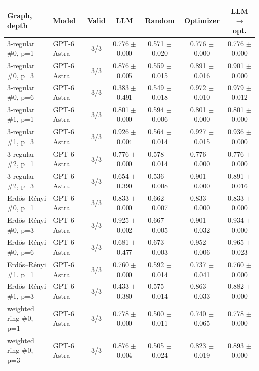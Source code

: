 \begin{tabular}{llccccc}
\toprule
Graph, depth & Model & Valid & LLM & Random & Optimizer & LLM$\to$opt. \\
\midrule
3-regular \#0, p=1 & GPT-6 Astra & 3/3 & 0.776 $\pm$ 0.000 & 0.571 $\pm$ 0.020 & 0.776 $\pm$ 0.000 & 0.776 $\pm$ 0.000 \\
3-regular \#0, p=3 & GPT-6 Astra & 3/3 & 0.876 $\pm$ 0.005 & 0.559 $\pm$ 0.015 & 0.891 $\pm$ 0.016 & 0.901 $\pm$ 0.000 \\
3-regular \#0, p=6 & GPT-6 Astra & 3/3 & 0.383 $\pm$ 0.491 & 0.549 $\pm$ 0.018 & 0.972 $\pm$ 0.010 & 0.979 $\pm$ 0.012 \\
3-regular \#1, p=1 & GPT-6 Astra & 3/3 & 0.801 $\pm$ 0.000 & 0.594 $\pm$ 0.006 & 0.801 $\pm$ 0.000 & 0.801 $\pm$ 0.000 \\
3-regular \#1, p=3 & GPT-6 Astra & 3/3 & 0.926 $\pm$ 0.004 & 0.564 $\pm$ 0.014 & 0.927 $\pm$ 0.015 & 0.936 $\pm$ 0.000 \\
3-regular \#2, p=1 & GPT-6 Astra & 3/3 & 0.776 $\pm$ 0.000 & 0.578 $\pm$ 0.014 & 0.776 $\pm$ 0.000 & 0.776 $\pm$ 0.000 \\
3-regular \#2, p=3 & GPT-6 Astra & 3/3 & 0.654 $\pm$ 0.390 & 0.536 $\pm$ 0.008 & 0.901 $\pm$ 0.000 & 0.891 $\pm$ 0.016 \\
Erd\H{o}s--R\'enyi \#0, p=1 & GPT-6 Astra & 3/3 & 0.833 $\pm$ 0.000 & 0.662 $\pm$ 0.007 & 0.833 $\pm$ 0.000 & 0.833 $\pm$ 0.000 \\
Erd\H{o}s--R\'enyi \#0, p=3 & GPT-6 Astra & 3/3 & 0.925 $\pm$ 0.002 & 0.667 $\pm$ 0.005 & 0.901 $\pm$ 0.032 & 0.934 $\pm$ 0.000 \\
Erd\H{o}s--R\'enyi \#0, p=6 & GPT-6 Astra & 3/3 & 0.681 $\pm$ 0.477 & 0.673 $\pm$ 0.003 & 0.952 $\pm$ 0.006 & 0.965 $\pm$ 0.023 \\
Erd\H{o}s--R\'enyi \#1, p=1 & GPT-6 Astra & 3/3 & 0.760 $\pm$ 0.000 & 0.592 $\pm$ 0.014 & 0.737 $\pm$ 0.041 & 0.760 $\pm$ 0.000 \\
Erd\H{o}s--R\'enyi \#1, p=3 & GPT-6 Astra & 3/3 & 0.433 $\pm$ 0.380 & 0.575 $\pm$ 0.014 & 0.863 $\pm$ 0.033 & 0.882 $\pm$ 0.000 \\
weighted ring \#0, p=1 & GPT-6 Astra & 3/3 & 0.778 $\pm$ 0.000 & 0.500 $\pm$ 0.011 & 0.740 $\pm$ 0.065 & 0.778 $\pm$ 0.000 \\
weighted ring \#0, p=3 & GPT-6 Astra & 3/3 & 0.876 $\pm$ 0.004 & 0.505 $\pm$ 0.024 & 0.823 $\pm$ 0.019 & 0.893 $\pm$ 0.000 \\
\bottomrule
\end{tabular}
